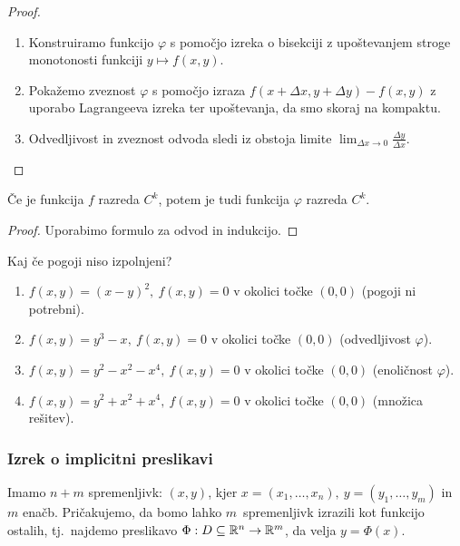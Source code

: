 \begin{proof} \
    \begin{enumerate}
        \item Konstruiramo funkcijo $\varphi$ s pomočjo izreka o bisekciji z upoštevanjem stroge monotonosti funkciji $y \mapsto f(x, y)$.
        \item Pokažemo zveznost \(\varphi\) s pomočjo izraza \(f(x + \Delta x, y + \Delta y) - f(x, y)\) z uporabo Lagrangeeva izreka ter upoštevanja, da smo skoraj na kompaktu.
        \item Odvedljivost in zveznost odvoda sledi iz obstoja limite \(\lim_{\Delta x \to 0} \frac{\Delta y}{\Delta x}\). \qedhere
    \end{enumerate}
\end{proof}

\begin{posledica}
    Če je funkcija $f$ razreda $C^k$, potem je tudi funkcija $\varphi$ razreda $C^k$.
\end{posledica}

\begin{proof}
    Uporabimo formulo za odvod in indukcijo.
\end{proof}

\begin{zgled}
    Kaj če pogoji niso izpolnjeni?
    \begin{enumerate}
        \item $f(x,y) = (x-y)^2, \ f(x,y) = 0$ v okolici točke $(0,0)$ (pogoji ni potrebni).
        \item $f(x,y) = y^3 - x, \ f(x,y) = 0$ v okolici točke $(0,0)$ (odvedljivost $\varphi$).
        \item $f(x,y) = y^2-x^2-x^4, \ f(x,y) = 0$ v okolici točke $(0,0)$ (enoličnost $\varphi$).
        \item $f(x,y) = y^2+x^2+x^4, \ f(x,y) = 0$ v okolici točke $(0,0)$ (množica rešitev).
    \end{enumerate}
\end{zgled}


\subsubsection{Izrek o implicitni preslikavi}
Imamo $n+m$ spremenljivk: $(x, y)$, kjer $x = (x_1, \ldots, x_n), \ y = (y_1, \ldots, y_m)$ in $m$ enačb. Pričakujemo, da bomo lahko $m$~spremenljivk izrazili kot funkcijo ostalih, tj.\ najdemo preslikavo $\Phi: D \subseteq \mathbb{R}^n \to \mathbb{R}^m$, da velja $y = \Phi(x)$.


